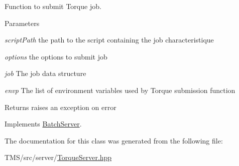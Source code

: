 Function to submit Torque job. 


\begin{DoxyParams}{Parameters}
\item[{\em scriptPath}]the path to the script containing the job characteristique \item[{\em options}]the options to submit job \item[{\em job}]The job data structure \item[{\em envp}]The list of environment variables used by Torque submission function \end{DoxyParams}
\begin{DoxyReturn}{Returns}
raises an exception on error 
\end{DoxyReturn}


Implements \hyperlink{classBatchServer_a078c0f8605e770c02b8eca0351526f59}{BatchServer}.



The documentation for this class was generated from the following file:\begin{DoxyCompactItemize}
\item 
TMS/src/server/\hyperlink{TorqueServer_8hpp}{TorqueServer.hpp}\end{DoxyCompactItemize}
